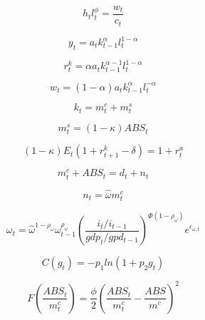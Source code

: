 \documentclass[10pt,math=newtx,citestyle=gb7714-2015,bibstyle=gb7714-2015]{elegantbook}
\begin{document}
	\begin{equation}\label{label}
		h_tl_t^{\phi}=\frac{w_t}{c_t}
	\end{equation}
	
	\begin{equation}\label{label}
		y_t=a_tk_{t-1}^{\alpha}l_t^{1-\alpha}
	\end{equation}
	
	\begin{equation}\label{label}
		r_t^k=\alpha a_tk_{t-1}^{\alpha-1}l_t^{1-\alpha}
	\end{equation}
	
	\begin{equation}\label{label}
		w_t=(1-\alpha)a_tk_{t-1}^{\alpha}l_t^{-\alpha}
	\end{equation}
	
	\begin{equation}\label{label}
		k_t=m_t^c+m_t^s
	\end{equation}
	
	\begin{equation}\label{label}
		m_t^s=(1-\kappa)ABS_t
	\end{equation}
	
	\begin{equation}\label{label}
		(1-\kappa)E_t(1+r_{t+1}^k-\delta)=1+r_t^a
	\end{equation}
	
	\begin{equation}\label{label}
		m_t^c+ABS_t=d_t+n_t
	\end{equation}
	
	\begin{equation}\label{label}
		n_t=\hat{\omega}m_t^c
	\end{equation}
	
	\begin{equation}\label{label}
		\omega_t=\hat{\omega}^{1-\rho_{\omega}}\omega_{t-1}^{\rho_{\omega}}\left(\frac{i_t/i_{t-1}}{gdp_t/gpd_{t-1}}\right)^{\Phi(1-\rho_{\omega})}e^{\epsilon_{\omega,t}}
	\end{equation}
	
	\begin{equation}\label{label}
		C(g_t)=-p_1ln(1+p_2g_t)
	\end{equation}
	
	\begin{equation}\label{label}
		F(\frac{ABS_t}{m_t^c})=\frac{\phi}{2}\left(\frac{ABS_t}{m_t^c}-\frac{ABS}{m^c}\right)^2
	\end{equation}
	
\end{document}

